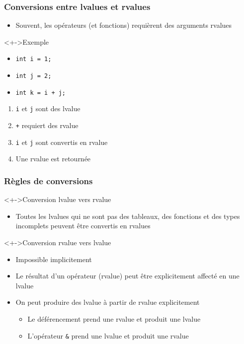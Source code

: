 \begin{frame}
\frametitle{Conversions entre lvalues et rvalues}
\begin{itemize}[<+->]
\item Souvent, les opérateurs (et fonctions) requièrent des arguments rvalues
\end{itemize}
\begin{exampleblock}<+->{Exemple}
	\begin{itemize}
	\item \lstinline|int i = 1;|
	\item \lstinline|int j = 2;|
	\item \lstinline|int k = i + j;|
	\end{itemize}
\end{exampleblock}
\begin{enumerate}[<+->]
\item \texttt{i} et \texttt{j} sont des lvalue
\item \texttt{+} requiert des rvalue
\item \texttt{i} et \texttt{j} sont convertis en rvalue
\item Une rvalue est retournée
\end{enumerate}
\end{frame}

\begin{frame}
\frametitle{Règles de conversions}
\begin{exampleblock}<+->{Conversion lvalue vers rvalue}
	\begin{itemize}[<+->]
	\item Toutes les lvalues qui ne sont pas des tableaux, des fonctions et des types incomplets peuvent être convertis en rvalues
	\end{itemize}
\end{exampleblock}
\begin{alertblock}<+->{Conversion rvalue vers lvalue}
	\begin{itemize}[<+->]
	\item Impossible implicitement
	\item Le résultat d'un opérateur (rvalue) peut être explicitement affecté en une lvalue
	\end{itemize}
\end{alertblock}
\begin{itemize}[<+->]
\item On peut produire des lvalue à partir de rvalue explicitement
	\begin{itemize}
	\item Le déférencement prend une rvalue et produit une lvalue
	\item L'opérateur \texttt{\&} prend une lvalue et produit une rvalue
	\end{itemize}
\end{itemize}
\end{frame}

